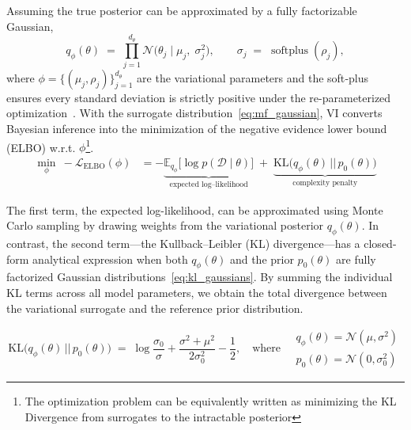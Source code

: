 \documentclass[preprint,12pt]{elsarticle}
\begin{document}
Assuming the true posterior can be approximated by a fully factorizable Gaussian, 
\begin{equation}
  q_{\phi}(\theta)
  \;=\;
  \prod_{j=1}^{d_\theta}
  \mathcal N\!\bigl(\theta_j \mid \mu_j,\;\sigma_j^{2}\bigr),
  \qquad
  \sigma_j \;=\; \operatorname{softplus}(\rho_j),
  \label{eq:mf_gaussian}
\end{equation}
where $\phi=\{(\mu_j,\rho_j)\}_{j=1}^{d_\theta}$ are the variational
parameters and the soft‐plus ensures every standard deviation is strictly
positive under the re-parameterized optimization~\cite{blundell_weight_2015}. With the surrogate distribution~\eqref{eq:mf_gaussian}, VI converts Bayesian inference into the minimization of the negative evidence lower bound (ELBO) w.r.t. $\phi$\footnote{The optimization problem can be equivalently written as minimizing the KL Divergence from surrogates to the intractable posterior}.
\begin{align}
  \min_{\phi}\ - \mathcal L_{\mathrm{ELBO}}(\phi) 
  &= -
     \underbrace{\mathbb E_{q_{\phi}}
       \!\bigl[\log p(\mathcal D\mid\theta)\bigr]}_{\text{expected log–likelihood}}
     \;+\;
     \underbrace{\mathrm{KL}\!\bigl(q_{\phi}(\theta)\,||\,p_{0}(\theta)\bigr)}_{\text{complexity penalty}}
  \label{eq:elbo}
\end{align}

The first term, the expected log-likelihood, can be approximated using Monte Carlo sampling by drawing weights from the variational posterior \( q_{\phi}(\theta) \). In contrast, the second term—the Kullback–Leibler (KL) divergence—has a closed-form analytical expression when both \( q_{\phi}(\theta) \) and the prior \( p_0(\theta) \) are fully factorized Gaussian distributions~\eqref{eq:kl_gaussians}. By summing the individual KL terms across all model parameters, we obtain the total divergence between the variational surrogate and the reference prior distribution.

\begin{equation}
  \mathrm{KL}
  \bigl(
    q_{\phi}(\theta)\,||\,p_{0}(\theta)
  \bigr)
  \;=\;
  \log\frac{\sigma_{0}}{\sigma}
  +\frac{\sigma^{2}+\mu^{2}}{2\sigma_{0}^{2}}
  -\frac12, \quad \text{where} \quad
  \begin{aligned}
    q_{\phi}(\theta) = \mathcal{N}(\mu, \sigma^2)\\
    p_{0}(\theta) = \mathcal{N}(0, \sigma_0^2)
  \end{aligned}
  \label{eq:kl_gaussians}
\end{equation}
\end{document}
